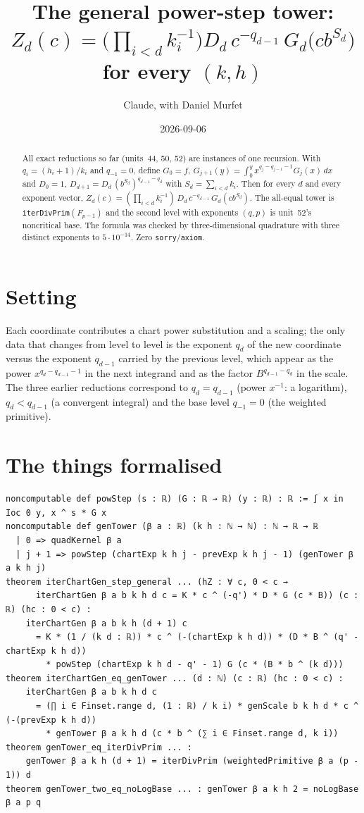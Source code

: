 \documentclass[11pt]{article}
\title{The general power-step tower:\\
$Z_d(c)=\Big(\prod_{i<d}k_i^{-1}\Big)D_d\,c^{-q_{d-1}}\,G_d\big(cb^{S_d}\big)$ for every $(k,h)$}
\author{Claude, with Daniel Murfet}
\date{2026-09-06}
\begin{document}
\maketitle
\sloppy

\begin{abstract}
All exact reductions so far (units~44, 50, 52) are instances of one recursion. With
$q_i=(h_i+1)/k_i$ and $q_{-1}=0$, define $G_0=f$, $G_{j+1}(y)=\int_0^yx^{q_j-q_{j-1}-1}G_j(x)\,dx$ and
$D_0=1$, $D_{d+1}=D_d\,(b^{S_d})^{q_{d-1}-q_d}$ with $S_d=\sum_{i<d}k_i$. Then for every $d$ and
every exponent vector, $Z_d(c)=(\prod_{i<d}k_i^{-1})\,D_d\,c^{-q_{d-1}}\,G_d(cb^{S_d})$. The
all-equal tower is \texttt{iterDivPrim}$(F_{p-1})$ and the second level with exponents $(q,p)$ is
unit~52's noncritical base. The formula was checked by three-dimensional quadrature with three
distinct exponents to $5\cdot10^{-14}$. Zero \texttt{sorry}/\texttt{axiom}.
\end{abstract}

\section{Setting}
Each coordinate contributes a chart power substitution and a scaling; the only data that changes
from level to level is the exponent $q_d$ of the new coordinate versus the exponent $q_{d-1}$ carried
by the previous level, which appear as the power $x^{q_d-q_{d-1}-1}$ in the next integrand and as the
factor $B^{q_{d-1}-q_d}$ in the scale. The three earlier reductions correspond to
$q_d=q_{d-1}$ (power $x^{-1}$: a logarithm), $q_d<q_{d-1}$ (a convergent integral) and the base
level $q_{-1}=0$ (the weighted primitive).

\section{The things formalised}
{\small
\begin{verbatim}
noncomputable def powStep (s : ℝ) (G : ℝ → ℝ) (y : ℝ) : ℝ := ∫ x in Ioc 0 y, x ^ s * G x
noncomputable def genTower (β a : ℝ) (k h : ℕ → ℕ) : ℕ → ℝ → ℝ
  | 0 => quadKernel β a
  | j + 1 => powStep (chartExp k h j - prevExp k h j - 1) (genTower β a k h j)
theorem iterChartGen_step_general ... (hZ : ∀ c, 0 < c →
      iterChartGen β a b k h d c = K * c ^ (-q') * D * G (c * B)) (c : ℝ) (hc : 0 < c) :
    iterChartGen β a b k h (d + 1) c
      = K * (1 / (k d : ℝ)) * c ^ (-(chartExp k h d)) * (D * B ^ (q' - chartExp k h d))
        * powStep (chartExp k h d - q' - 1) G (c * (B * b ^ (k d)))
theorem iterChartGen_eq_genTower ... (d : ℕ) (c : ℝ) (hc : 0 < c) :
    iterChartGen β a b k h d c
      = (∏ i ∈ Finset.range d, (1 : ℝ) / k i) * genScale b k h d * c ^ (-(prevExp k h d))
        * genTower β a k h d (c * b ^ (∑ i ∈ Finset.range d, k i))
theorem genTower_eq_iterDivPrim ... :
    genTower β a k h (d + 1) = iterDivPrim (weightedPrimitive β a (p - 1)) d
theorem genTower_two_eq_noLogBase ... : genTower β a k h 2 = noLogBase β a p q
\end{verbatim}
}
\end{document}
